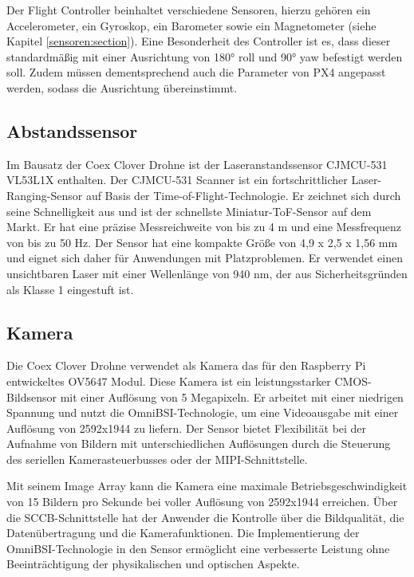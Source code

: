 Der Flight Controller beinhaltet verschiedene Sensoren, hierzu gehören ein Accelerometer, ein Gyroskop, ein Barometer sowie ein Magnetometer (siehe Kapitel \ref{sensoren:section}).
Eine Besonderheit des Controller ist es, dass dieser standardmäßig mit einer Ausrichtung von 180° roll und 90° yaw befestigt werden soll. Zudem müssen dementsprechend auch die Parameter von PX4 angepasst werden, sodass die Ausrichtung übereinstimmt. \cite[vgl.][]{coex_pix_fcu}   



\subsection{Abstandssensor}
Im Bausatz der Coex Clover Drohne ist der Laseranstandssensor CJMCU-531 VL53L1X enthalten. Der CJMCU-531 Scanner ist ein fortschrittlicher Laser-Ranging-Sensor auf Basis der Time-of-Flight-Technologie. Er zeichnet sich durch seine Schnelligkeit aus und ist der schnellste Miniatur-ToF-Sensor auf dem Markt. Er hat eine präzise Messreichweite von bis zu 4 m und eine Messfrequenz von bis zu 50 Hz.
Der Sensor hat eine kompakte Größe von 4,9 x 2,5 x 1,56 mm und eignet sich daher für Anwendungen mit Platzproblemen. Er verwendet einen unsichtbaren Laser mit einer Wellenlänge von 940 nm, der aus Sicherheitsgründen als Klasse 1 eingestuft ist. \cite[vgl.][Seite 1]{CJMCU-531}


\subsection{Kamera}
Die Coex Clover Drohne verwendet als Kamera das für den Raspberry Pi entwickeltes OV5647 Modul.
Diese Kamera ist ein leistungsstarker CMOS-Bildsensor mit einer Auflösung von 5 Megapixeln. Er arbeitet mit einer niedrigen Spannung und nutzt die OmniBSI-Technologie, um eine Videoausgabe mit einer Auflösung von 2592x1944 zu liefern. Der Sensor bietet Flexibilität bei der Aufnahme von Bildern mit unterschiedlichen Auflösungen durch die Steuerung des seriellen Kamerasteuerbusses oder der MIPI-Schnittstelle.

Mit seinem Image Array kann die Kamera eine maximale Betriebsgeschwindigkeit von 15 Bildern pro Sekunde bei voller Auflösung von 2592x1944 erreichen. Über die SCCB-Schnittstelle hat der Anwender die Kontrolle über die Bildqualität, die Datenübertragung und die Kamerafunktionen. Die Implementierung der OmniBSI-Technologie in den Sensor ermöglicht eine verbesserte Leistung ohne Beeinträchtigung der physikalischen und optischen Aspekte. \cite[vgl.][Kapitel 2.1]{OV5647}

